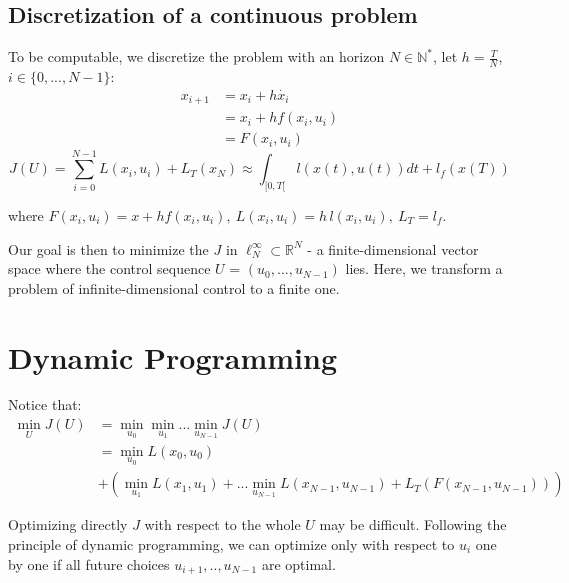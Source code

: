 \documentclass{report}
\begin{document}
\subsection{Discretization of a continuous problem}
To be computable, we discretize the problem with an horizon $N \in \mathbb{N}^*$, let $h=\frac{T}{N}$, $i\in \{0, ..., N-1\}$:
\begin{align*}
    x_{i+1} &= x_i + h \dot{x_i}  \\
            &= x_i + h f(x_i, u_i)  \\
            &= F(x_i, u_i)
\end{align*}
\begin{equation}
J(U) = \sum_{i = 0}^{N-1} L(x_i, u_i) + L_T(x_N) \approx \int_{[0,T[} l(x(t),u(t)) dt + l_f(x(T))
\end{equation}

where $F(x_i, u_i) = x + h f(x_i, u_i), \ L(x_i, u_i) =h\,l(x_i, u_i), \ L_T = l_f $.

\medskip

Our goal is then to minimize the $J$ in $\ell_N^\infty \subset \mathbb{R}^N$ - a finite-dimensional vector space where the control sequence $U$ = $(u_0, ..., u_{N-1})$ lies. Here, we transform a problem of infinite-dimensional control to a finite one.

\section{Dynamic Programming}
Notice that:
\begin{equation}
\begin{split}
\min_{U} J(U) &= \min_{u_0} \min_{u_1} ... \min_{u_{N-1}} J(U) \\
					 &= \min_{u_0} L(x_0, u_0)  \\
					 &+ (\min_{u_1} L(x_1, u_1) +... \min_{u_{N-1}}L(x_{N-1}, u_{N-1}) + L_T(F(x_{N-1}, u_{N-1})))
\end{split}
\end{equation}

Optimizing directly $J$ with respect to the whole $U$ may be difficult. Following the principle of dynamic programming, we can optimize only with respect to $u_i$ one by one if all future choices $u_{i+1}, .., u_{N-1}$ are optimal. 
\end{document}

